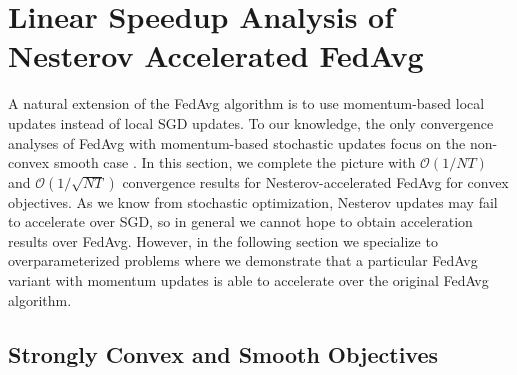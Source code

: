 


\section{Linear Speedup Analysis of Nesterov Accelerated FedAvg}

A natural extension of the FedAvg algorithm is to use momentum-based
local updates instead of local SGD updates. To our knowledge, the
only convergence analyses of FedAvg with momentum-based stochastic
updates focus on the non-convex smooth case \cite{yu2019linear,huo2020faster,li2018federated}.
In this section, we complete the picture with $\mathcal{O}(1/NT)$
and $\mathcal{O}(1/\sqrt{NT})$ convergence results for Nesterov-accelerated
FedAvg for convex objectives. As we know from stochastic optimization,
Nesterov updates may fail to accelerate over SGD, so in general we
cannot hope to obtain acceleration results over FedAvg. However, in
the following section we specialize to overparameterized problems
where we demonstrate that a particular FedAvg variant with momentum
updates is able to accelerate over the original FedAvg algorithm. 

\subsection{Strongly Convex and Smooth Objectives}

